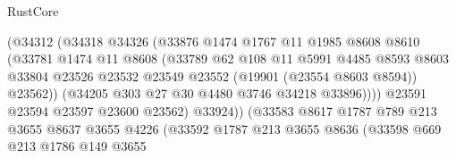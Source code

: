 \begin{lexlean}{RustCore}
\begin{coremodule}
                                    (@34312
                                      (@34318
                                        @34326
                                        (@33876
                                          @1474
                                          @1767
                                          @11
                                          @1985
                                          @8608
                                          @8610
                                          (@33781
                                            @1474
                                            @11
                                            @8608
                                            (@33789
                                              @62
                                              @108
                                              @11
                                              @5991
                                              @4485
                                              @8593
                                              @8603
                                              @33804
                                              @23526
                                              @23532
                                              @23549
                                              @23552
                                              (@19901 (@23554 @8603 @8594))
                                              @23562))
                                          (@34205 @303 @27 @30 @4480 @3746 @34218 @33896))))
                                    @23591
                                    @23594
                                    @23597
                                    @23600
                                    @23562)
                                  @33924))
                              (@33583
                                @8617
                                @1787
                                @789
                                @213
                                @3655
                                @8637
                                @3655
                                @4226
                                (@33592
                                  @1787
                                  @213
                                  @3655
                                  @8636
                                  (@33598
                                    @669
                                    @213
                                    @1786
                                    @149
                                    @3655

\end{coremodule}
\end{lexlean}
